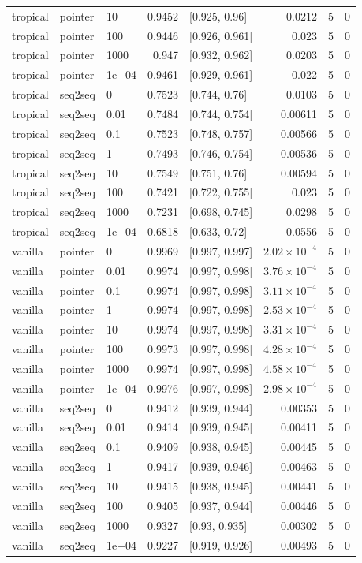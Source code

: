 \documentclass[10pt]{article}
\begin{document}
{\begin{longtable}{lllrlrrr}
tropical & pointer & 10 & 0.9452 & [0.925, 0.96] & 0.0212 & 5 & 0\\
tropical & pointer & 100 & 0.9446 & [0.926, 0.961] & 0.023 & 5 & 0\\
tropical & pointer & 1000 & 0.947 & [0.932, 0.962] & 0.0203 & 5 & 0\\
tropical & pointer & 1e+04 & 0.9461 & [0.929, 0.961] & 0.022 & 5 & 0\\
tropical & seq2seq & 0 & 0.7523 & [0.744, 0.76] & 0.0103 & 5 & 0\\
tropical & seq2seq & 0.01 & 0.7484 & [0.744, 0.754] & 0.00611 & 5 & 0\\
tropical & seq2seq & 0.1 & 0.7523 & [0.748, 0.757] & 0.00566 & 5 & 0\\
tropical & seq2seq & 1 & 0.7493 & [0.746, 0.754] & 0.00536 & 5 & 0\\
tropical & seq2seq & 10 & 0.7549 & [0.751, 0.76] & 0.00594 & 5 & 0\\
tropical & seq2seq & 100 & 0.7421 & [0.722, 0.755] & 0.023 & 5 & 0\\
tropical & seq2seq & 1000 & 0.7231 & [0.698, 0.745] & 0.0298 & 5 & 0\\
tropical & seq2seq & 1e+04 & 0.6818 & [0.633, 0.72] & 0.0556 & 5 & 0\\
vanilla & pointer & 0 & 0.9969 & [0.997, 0.997] & $2.02\times10^{-4}$ & 5 & 0\\
vanilla & pointer & 0.01 & 0.9974 & [0.997, 0.998] & $3.76\times10^{-4}$ & 5 & 0\\
vanilla & pointer & 0.1 & 0.9974 & [0.997, 0.998] & $3.11\times10^{-4}$ & 5 & 0\\
vanilla & pointer & 1 & 0.9974 & [0.997, 0.998] & $2.53\times10^{-4}$ & 5 & 0\\
vanilla & pointer & 10 & 0.9974 & [0.997, 0.998] & $3.31\times10^{-4}$ & 5 & 0\\
vanilla & pointer & 100 & 0.9973 & [0.997, 0.998] & $4.28\times10^{-4}$ & 5 & 0\\
vanilla & pointer & 1000 & 0.9974 & [0.997, 0.998] & $4.58\times10^{-4}$ & 5 & 0\\
vanilla & pointer & 1e+04 & 0.9976 & [0.997, 0.998] & $2.98\times10^{-4}$ & 5 & 0\\
vanilla & seq2seq & 0 & 0.9412 & [0.939, 0.944] & 0.00353 & 5 & 0\\
vanilla & seq2seq & 0.01 & 0.9414 & [0.939, 0.945] & 0.00411 & 5 & 0\\
vanilla & seq2seq & 0.1 & 0.9409 & [0.938, 0.945] & 0.00445 & 5 & 0\\
vanilla & seq2seq & 1 & 0.9417 & [0.939, 0.946] & 0.00463 & 5 & 0\\
vanilla & seq2seq & 10 & 0.9415 & [0.938, 0.945] & 0.00441 & 5 & 0\\
vanilla & seq2seq & 100 & 0.9405 & [0.937, 0.944] & 0.00446 & 5 & 0\\
vanilla & seq2seq & 1000 & 0.9327 & [0.93, 0.935] & 0.00302 & 5 & 0\\
vanilla & seq2seq & 1e+04 & 0.9227 & [0.919, 0.926] & 0.00493 & 5 & 0\\
\bottomrule
\end{longtable}
}
\end{document}
